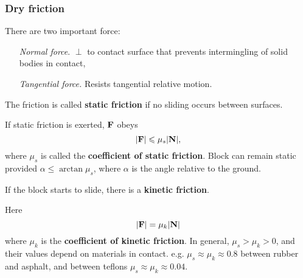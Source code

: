 \subsubsection*{Dry friction}
There are two important force:
\begin{enumerate}[align=left]
    \item[\textit{Normal force}.] $ \perp $ to contact surface that prevents intermingling of solid bodies in contact,
    \item[\textit{Tangential force.}] Resists tangential relative motion. 
\end{enumerate}
\begin{center}
\end{center}

\begin{definition}
    The friction is called \textbf{static friction} if no sliding occurs between surfaces.
\end{definition}

If static friction is exerted, ${\bf F}$ obeys 
\[
    |{\bf F}|\leqslant \mu_s|{\bf N}|,
\]
where $\mu_s$ is called the \textbf{coefficient of static friction}. Block can remain static provided $ \alpha\le \arctan \mu_s $, where $ \alpha $ is the angle relative to the ground.

\begin{definition}
    If the block starts to slide, there is a \textbf{kinetic friction}.
\end{definition}
Here
\[
    |{\bf F}| = \mu_k|{\bf N}|
\]
where $ \mu_k $ is the \textbf{coefficient of kinetic friction}. In general, $ \mu_s>\mu_k>0 $, and their values depend on materials in contact. e.g. $ \mu_s\approx \mu_k\approx 0.8 $ between rubber and asphalt, and between teflons $ \mu_s\approx \mu_k\approx 0.04 $.

